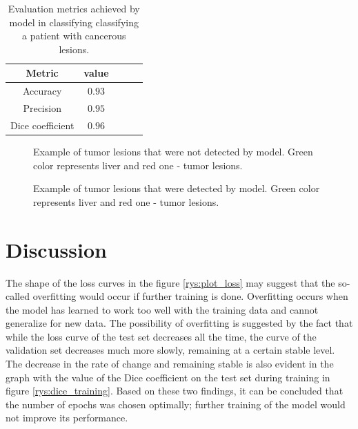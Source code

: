 \begin{table}[h!]
    \centering
    \begin{tabular}{|c|c|c|c|c|}
    \hline
        Metric & value  \\
        \hline 
        Accuracy & $0.93$ \\
        \hline
        Precision &$0.95$ \\
        \hline
        Dice coefficient & $0.96$\\
        \hline
    \end{tabular}
    \caption{Evaluation metrics achieved by model in classifying classifying a patient with cancerous lesions.}
    \label{tab:metrics_prob_3}
\end{table}


\begin{figure}[H]%
    \centering
    \qquad
    \caption{Example of tumor lesions that were not detected by model. Green color represents liver and red one - tumor lesions.}%
    \label{fig:no_detected}%
\end{figure}



\begin{figure}[H]%
    \centering
    \qquad
    \caption{Example of tumor lesions that were detected by model. Green color represents liver and red one - tumor lesions.}%
    \label{fig:detected}%
\end{figure}

\section{Discussion}

The shape of the loss curves in the figure \ref{rys:plot_loss} may suggest that the so-called overfitting would occur if further training is done. Overfitting occurs when the model has learned to work too well with the training data and cannot generalize for new data. The possibility of overfitting is suggested by the fact that while the loss curve of the test set decreases all the time, the curve of the validation set decreases much more slowly, remaining at a certain stable level. The decrease in the rate of change and remaining stable is also evident in the graph with the value of the Dice coefficient on the test set during training in figure \ref{rys:dice_training}. Based on these two findings, it can be concluded that the number of epochs was chosen optimally; further training of the model would not improve its performance.

